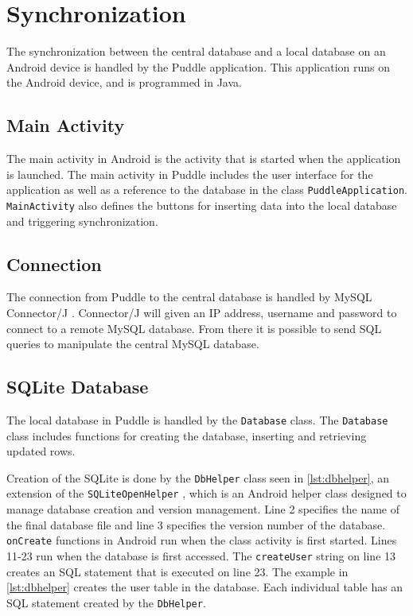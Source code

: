 \section{Synchronization}
The synchronization between the central database and a local database on an Android device is handled by the Puddle application. This application runs on the Android device, and is programmed in Java.

\subsection{Main Activity}
The main activity in Android is the activity that is started when the application is launched. The main activity in Puddle includes the user interface for the application as well as a reference to the database in the class \lstinline|PuddleApplication|. \lstinline|MainActivity| also defines the buttons for inserting data into the local database and triggering synchronization.

\subsection{Connection}
The connection from Puddle to the central database is handled by MySQL Connector/J \citep{mysqlconnectorj}. Connector/J will given an IP address, username and password to connect to a remote MySQL database. From there it is possible to send SQL queries to manipulate the central MySQL database.

\subsection{SQLite Database}
The local database in Puddle is handled by the \lstinline|Database| class. The \lstinline|Database| class includes functions for creating the database, inserting and retrieving updated rows.

Creation of the SQLite is done by the \lstinline|DbHelper| class seen in \autoref{lst:dbhelper}, an extension of the \lstinline|SQLiteOpenHelper| \citep{sqliteopenhelper}, which is an Android helper class designed to manage database creation and version management. Line 2 specifies the name of the final database file and line 3 specifies the version number of the database.
\lstinline|onCreate| functions in Android run when the class activity is first started. Lines 11-23 run when the database is first accessed. The \lstinline|createUser| string on line 13 creates an SQL statement that is executed on line 23. The example in \autoref{lst:dbhelper} creates the user table in the database. Each individual table has an SQL statement created by the \lstinline|DbHelper|.


